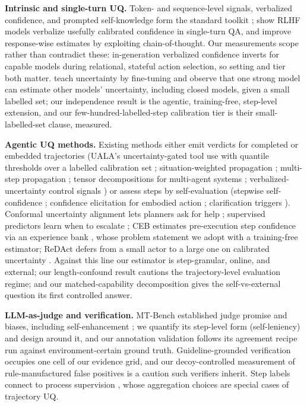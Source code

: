 \documentclass{article}
\begin{document}
\textbf{Intrinsic and single-turn UQ.} Token- and sequence-level signals,
verbalized confidence, and prompted self-knowledge form the standard toolkit
\citep{kadavath2022language,fadeeva2023lmpolygraph}; \citet{tian2023just} show
RLHF models verbalize usefully calibrated confidence in single-turn QA, and
\citet{zhang2025cotuq} improve response-wise estimates by exploiting
chain-of-thought. Our measurements scope rather than contradict these:
in-generation verbalized confidence inverts for capable models during
relational, stateful action selection, so setting and tier both matter.
\citet{kapoor2024large} teach uncertainty by fine-tuning and observe that one
strong model can estimate other models' uncertainty, including closed models,
given a small labelled set; our independence result is the agentic,
training-free, step-level extension, and our few-hundred-labelled-step calibration tier is
their small-labelled-set clause, measured.

\textbf{Agentic UQ methods.} Existing methods either emit verdicts for
completed or embedded trajectories (UALA's uncertainty-gated tool use with
quantile thresholds over a labelled calibration set \citep{han2024uala};
situation-weighted propagation \citep{zhao2024saup}; multi-step propagation
\citep{duan2025uprop}; tensor decompositions for multi-agent systems
\citep{chen2026matu}; verbalized-uncertainty control signals
\citep{zhang2026auq,zhang2026webuncertainty}) or assess steps by
self-evaluation (stepwise self-confidence \citep{mavi2025stepwise};
confidence elicitation for embodied action \citep{yu2025embodied};
clarification triggers \citep{matsnev2026decomp}). Conformal uncertainty
alignment lets planners ask for help \citep{ren2023robots}; supervised
predictors learn when to escalate \citep{bachar2026escalate}; CEB estimates
pre-execution step confidence via an experience bank \citep{zeng2026ceb},
whose problem statement we adopt with a training-free estimator; ReDAct
defers from a small actor to a large one on calibrated uncertainty
\citep{piatrashyn2026redact}. Against this line our estimator is
step-granular, online, and external; our length-confound result cautions the
trajectory-level evaluation regime; and our matched-capability decomposition
gives the self-vs-external question its first controlled answer.

\textbf{LLM-as-judge and verification.} MT-Bench established judge promise
and biases, including self-enhancement \citep{zheng2023judging}; we quantify
its step-level form (self-leniency) and design around it, and our annotation
validation follows its agreement recipe run against environment-certain
ground truth. Guideline-grounded verification \citep{zhang2026glean} occupies
one cell of our evidence grid, and our decoy-controlled measurement of
rule-manufactured false positives is a caution such verifiers inherit. Step
labels connect to process supervision \citep{lightman2024lets}, whose
aggregation choices are special cases of trajectory UQ.
\end{document}

